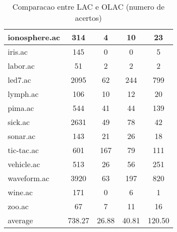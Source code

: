 \begin{table}[htbp]
\begin{tabular}{|l|c|c|c|c|}
		\hline
		ionosphere.ac   & 314           & 4                  & 10                       & 23                            \\
		\hline
		iris.ac         & 145           & 0                  & 0                        & 5                             \\
		\hline
		labor.ac        & 51            & 2                  & 2                        & 2                             \\
		\hline
		led7.ac         & 2095          & 62                 & 244                      & 799                           \\
		\hline
		lymph.ac        & 106           & 10                 & 12                       & 20                            \\
		\hline
		pima.ac         & 544           & 41                 & 44                       & 139                           \\
		\hline
		sick.ac         & 2631          & 49                 & 78                       & 42                            \\
		\hline
		sonar.ac        & 143           & 21                 & 26                       & 18                            \\
		\hline
		tic-tac.ac      & 601           & 167                & 79                       & 111                           \\
		\hline
		vehicle.ac      & 513           & 26                 & 56                       & 251                           \\
		\hline
		waveform.ac     & 3920          & 63                 & 197                      & 820                           \\
		\hline
		wine.ac         & 171           & 0                  & 6                        & 1                             \\
		\hline
		zoo.ac          & 67            & 7                  & 11                       & 16                            \\
		\hline
		average         & 738.27        & 26.88              & 40.81                    & 120.50                        \\
		\hline
		\end{tabular}
	\caption{Comparacao entre LAC e OLAC (numero de acertos)}
	\label{tab:comparison_lac_olac_uc}
\end{table}